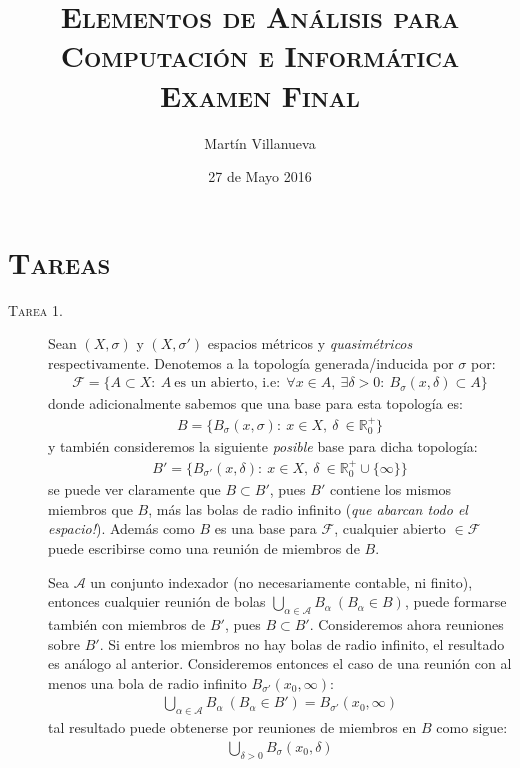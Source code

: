 \documentclass[spanish, fleqn]{article}
\title{\textsc{Elementos de Análisis para Computación e Informática} \\
    \textsc{Examen Final}}
\author{Martín Villanueva}
\date{27 de Mayo 2016}
\begin{document}
\maketitle


\section*{\textsc{Tareas}}


\begin{description}

    \item[\textsc{Tarea 1.}] Sean $(X , \sigma)$ y $(X, \sigma')$ espacios métricos y \textit{quasimétricos} respectivamente. Denotemos a la topología generada/inducida por $\sigma$ por:
    \begin{align*}
        \mathcal{F} = \{ A \subset X: \ A \ \text{es un abierto, i.e:} \ \ \forall x \in A, \ \exists \delta>0: \ B_{\sigma}(x,\delta) \subset A \}
    \end{align*}
    donde adicionalmente sabemos que una base para esta topología es:
    \begin{align*}
        B = \{ B_{\sigma}(x, \sigma): \ x \in X, \ \delta \ \in \mathbb{R}_{0}^{+}  \}
    \end{align*}
    y también consideremos la siguiente \textit{posible} base para dicha topología:
    \begin{align*}
        B' = \{ B_{\sigma'}(x,\delta): \ x \in X, \ \delta \ \in  \mathbb{R}_{0}^{+} \cup \{ \infty \} \}
    \end{align*}
    se puede ver claramente que $B \subset B'$, pues $B'$ contiene los mismos miembros que $B$, más las bolas de radio infinito (\textit{que abarcan todo el espacio!}). Además como $B$ es una base para $\mathcal{F}$, cualquier abierto $\in \mathcal{F}$ puede escribirse como una reunión de miembros de $B$.

    Sea $\mathcal{A}$ un conjunto indexador (no necesariamente contable, ni finito), entonces cualquier reunión de bolas \newline $ \bigcup_{\alpha \in \mathcal{A}} B_{\alpha}  \ (B_{\alpha} \in B)$, puede formarse también con miembros de $B'$, pues $B \subset B'$.
    Consideremos ahora reuniones sobre $B'$. Si entre los miembros no hay bolas de radio infinito, el resultado es análogo
    al anterior. Consideremos entonces el caso de una reunión con al menos una bola de radio infinito $B_{\sigma'}(x_0, \infty)$:
    \begin{align*}
        \bigcup_{\alpha \in \mathcal{A}} B_{\alpha} \ (B_{\alpha} \in B') = B_{\sigma'}(x_0, \infty)
    \end{align*}
    tal resultado puede obtenerse por reuniones de miembros en $B$ como sigue:
    \begin{align*}
        \bigcup_{\delta > 0} B_{\sigma}(x_0, \delta)
    \end{align*}


\end{description}
\end{document}
